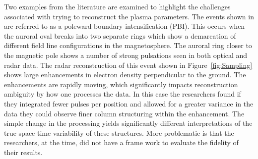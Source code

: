Two examples from the literature are examined to highlight the challenges associated with trying to reconstruct the plasma parameters.
The events shown in \citep{Semeter:2005fo} are referred to as a poleward boundary intensification (PBI). This occurs when the auroral oval breaks into two separate rings which show a demarcation of different field line configurations in the magnetosphere. The auroral ring closer to the magnetic pole shows a number of strong pulsations seen in both optical and radar data. The radar reconstruction of this event shown in Figure~\ref{fig:Sampling} shows large enhancements in electron density perpendicular to the ground. The enhancements are rapidly moving, which significantly impacts reconstruction ambiguity by how one processes the data. In this case the researchers found if they integrated fewer pulses per position and allowed for a greater variance in the data they could observe finer column structuring within the enhancement. The simple change in the processing yields significantly different interpretations of the true space-time variability of these structures. More problematic is that the researchers, at the time, did not have a frame work to evaluate the fidelity of their results.
%
%

